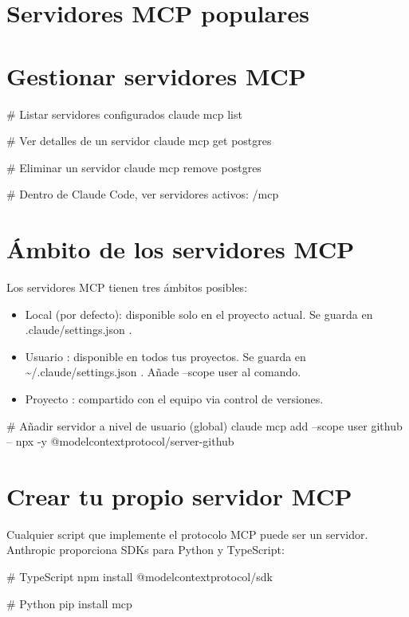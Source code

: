 \documentclass[11pt,a4paper]{book}
\begin{document}
\section{Servidores MCP populares}
\section{Gestionar servidores MCP}
\begin{codebox}
# Listar servidores configurados
claude mcp list

# Ver detalles de un servidor
claude mcp get postgres

# Eliminar un servidor
claude mcp remove postgres

# Dentro de Claude Code, ver servidores activos:
/mcp
\end{codebox}
\section{Ámbito de los servidores MCP}
Los servidores MCP tienen tres ámbitos posibles:

\begin{itemize}\item Local (por defecto): disponible solo en el proyecto actual. Se guarda en .claude/settings.json .\end{itemize}
\begin{itemize}\item Usuario : disponible en todos tus proyectos. Se guarda en \textasciitilde{}/.claude/settings.json . Añade --scope user al comando.\end{itemize}
\begin{itemize}\item Proyecto : compartido con el equipo via control de versiones.\end{itemize}
\begin{codebox}
# Añadir servidor a nivel de usuario (global)
claude mcp add --scope user github -- npx -y @modelcontextprotocol/server-github
\end{codebox}
\section{Crear tu propio servidor MCP}
Cualquier script que implemente el protocolo MCP puede ser un servidor. Anthropic proporciona SDKs para Python y TypeScript:

\begin{codebox}
# TypeScript
npm install @modelcontextprotocol/sdk

# Python
pip install mcp
\end{codebox}
\end{document}
